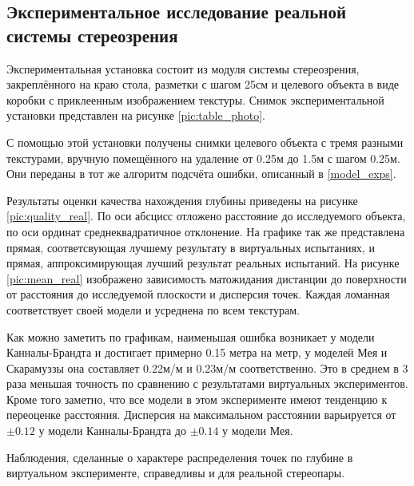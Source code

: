 \subsection{Экспериментальное исследование реальной системы стереозрения}

Экспериментальная установка состоит из модуля системы стереозрения, закреплённого на краю стола, 
разметки с шагом 25см и целевого объекта в виде коробки с приклеенным изображением текстуры. Снимок 
экспериментальной установки представлен на рисунке \ref{pic:table_photo}. 


С помощью этой установки получены снимки целевого объекта с тремя разными текстурами, вручную помещённого на
удаление от 0.25м до 1.5м с шагом 0.25м. Они переданы в тот же алгоритм подсчёта ошибки, описанный в \ref{model_exps}. 

Результаты оценки качества нахождения глубины приведены на рисунке \ref{pic:quality_real}. По оси абсцисс 
отложено расстояние до исследуемого объекта, по оси ординат среднеквадратичное отклонение. На графике так же 
представлена прямая, соответсвующая лучшему результату в виртуальных испытаниях, и прямая, аппроксимирующая лучший результат
реальных испытаний. На рисунке \ref{pic:mean_real}
 изображено зависимость матожидания дистанции до поверхности от расстояния до исследуемой плоскости и дисперсия точек.
Каждая ломанная соответствует своей модели и усреднена по всем текстурам.



Как можно заметить по графикам, наименьшая ошибка возникает у модели Канналы-Брандта и достигает примерно 0.15 метра на метр, 
у моделей Мея и Скарамуззы она составляет 0.22м/м и 0.23м/м соответственно. Это в среднем в 3 раза меньшая точность 
по сравнению с результатами виртуальных экспериментов. Кроме того заметно, что все модели в этом эксперименте имеют тенденцию
к переоценке расстояния.  Дисперсия на максимальном расстоянии варьируется от  $\pm 0.12$ у модели Канналы-Брандта 
до $\pm 0.14$ у модели Мея. %

Наблюдения, сделанные о характере распределения точек по глубине в виртуальном эксперименте, справедливы и для 
реальной стереопары.



